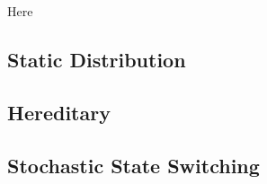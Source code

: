 Here

\subsection{Static Distribution}\label{subsec:static-derivation}


\subsection{Hereditary}\label{subsec:rw-derivation}


\subsection{Stochastic State Switching}\label{subsec:stochastic-state-switching-derivation}
